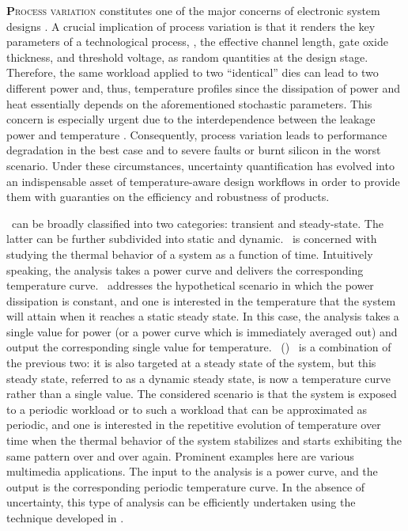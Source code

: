 \lettrine[findent=0.4em, nindent=0em]{\textbf{P}}{rocess variation} constitutes one of the major concerns of electronic system designs \cite{srivastava2010}.
A crucial implication of process variation is that it renders the key parameters of a technological process, \eg, the effective channel length, gate oxide thickness, and threshold voltage, as random quantities at the design stage.
Therefore, the same workload applied to two ``identical'' dies can lead to two different power and, thus, temperature profiles since the dissipation of power and heat essentially depends on the aforementioned stochastic parameters.
This concern is especially urgent due to the interdependence between the leakage power and temperature \cite{liu2007}.
Consequently, process variation leads to performance degradation in the best case and to severe faults or burnt silicon in the worst scenario.
Under these circumstances, uncertainty quantification \cite{maitre2010} has evolved into an indispensable asset of temperature-aware design workflows in order to provide them with guaranties on the efficiency and robustness of products.

\Ta\ can be broadly classified into two categories: transient and steady-state.
The latter can be further subdivided into static and dynamic.
\Tta\ is concerned with studying the thermal behavior of a system as a function of time.
Intuitively speaking, the analysis takes a power curve and delivers the corresponding temperature curve.
\Sssta\ addresses the hypothetical scenario in which the power dissipation is constant, and one is interested in the temperature that the system will attain when it reaches a static steady state.
In this case, the analysis takes a single value for power (or a power curve which is immediately averaged out) and output the corresponding single value for temperature.
\Dss\ (\DSS) \ta\ is a combination of the previous two: it is also targeted at a steady state of the system, but this steady state, referred to as a dynamic steady state, is now a temperature curve rather than a single value.
The considered scenario is that the system is exposed to a periodic workload or to such a workload that can be approximated as periodic, and one is interested in the repetitive evolution of temperature over time when the thermal behavior of the system stabilizes and starts exhibiting the same pattern over and over again.
Prominent examples here are various multimedia applications.
The input to the analysis is a power curve, and the output is the corresponding periodic temperature curve.
In the absence of uncertainty, this type of analysis can be efficiently undertaken using the technique developed in \cite{ukhov2012}.

